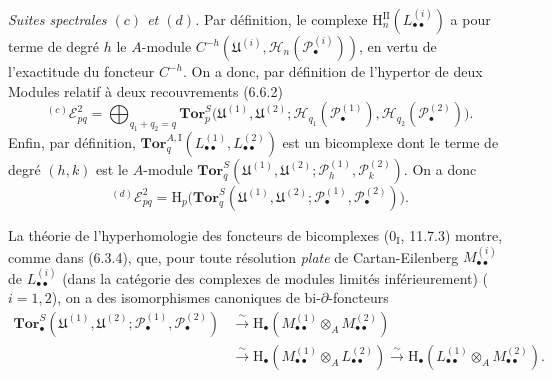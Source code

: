 \begin{env}[6.6.5]
\emph{Suites spectrales $(c)$ et $(d)$.} Par définition, le complexe
$\mathrm H_n^{\mathrm{II}}(L_{\bullet\bullet}^{(i)})$ a pour terme de degré
$h$ le $A$-module
$C^{-h}(\mathfrak U^{(i)},\mathscr H_n(\mathscr P_\bullet^{(i)}))$, en vertu
de l'exactitude du foncteur $C^{-h}$. On a donc, par définition de l'hypertor
de deux Modules relatif à deux recouvrements (6.6.2)
\[
  {}^{(c)}\mathscr E_{pq}^2
  =\bigoplus_{q_1+q_2=q}
   \mathbf{Tor}_p^S
   \bigl(\mathfrak U^{(1)},\mathfrak U^{(2)};
         \mathscr H_{q_1}(\mathscr P_\bullet^{(1)}),
         \mathscr H_{q_2}(\mathscr P_\bullet^{(2)})\bigr).
\]
Enfin, par définition,
$\mathbf{Tor}_q^{A,\mathrm I}
(L_{\bullet\bullet}^{(1)},L_{\bullet\bullet}^{(2)})$ est un bicomplexe dont
le terme de degré $(h,k)$ est le $A$-module
$\mathbf{Tor}_q^S
(\mathfrak U^{(1)},\mathfrak U^{(2)};
 \mathscr P_h^{(1)},\mathscr P_k^{(2)})$. On a donc
\[
  {}^{(d)}\mathscr E_{pq}^2
  =\mathrm H_p\bigl(
    \mathbf{Tor}_q^S
    (\mathfrak U^{(1)},\mathfrak U^{(2)};
     \mathscr P_\bullet^{(1)},\mathscr P_\bullet^{(2)})\bigr).
\]
\end{env}

\begin{env}[6.6.6]
La théorie de l'hyperhomologie des foncteurs de bicomplexes
($0_{\mathrm I}$, 11.7.3) montre, comme dans (6.3.4), que, pour toute
résolution \emph{plate} de Cartan-Eilenberg $M_{\bullet\bullet}^{(i)}$ de
$L_{\bullet\bullet}^{(i)}$ (dans la catégorie des complexes de modules
limités inférieurement) ($i=1,2$), on a des isomorphismes canoniques de
bi-$\partial$-foncteurs
\[
\begin{aligned}
  \mathbf{Tor}_\bullet^S
  (\mathfrak U^{(1)},\mathfrak U^{(2)};
   \mathscr P_\bullet^{(1)},\mathscr P_\bullet^{(2)})
  &\xrightarrow{\sim}
   \mathrm H_\bullet
   (M_{\bullet\bullet}^{(1)}\otimes_A M_{\bullet\bullet}^{(2)})\\
  &\xrightarrow{\sim}
   \mathrm H_\bullet
   (M_{\bullet\bullet}^{(1)}\otimes_A L_{\bullet\bullet}^{(2)})
   \xrightarrow{\sim}
   \mathrm H_\bullet
   (L_{\bullet\bullet}^{(1)}\otimes_A M_{\bullet\bullet}^{(2)}).
\end{aligned}
\tag{6.6.6.1}\label{III.6.6.6.1.fr}
\]
\end{env}

